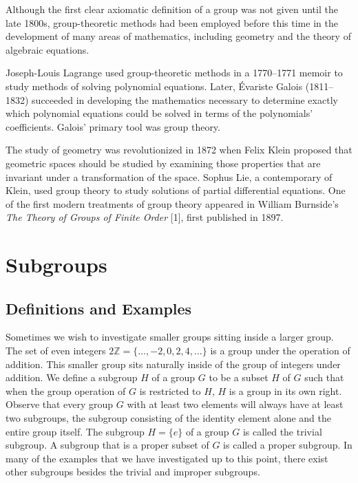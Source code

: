  
\histhead
 
 
\noindent
{\small \histf
Although the first clear axiomatic definition of a group was not given
until the late 1800s,  group-theoretic methods had been employed
before this time in the development of  many areas of mathematics,
including geometry and the theory of algebraic equations.  
 

Joseph-Louis Lagrange used
group-theoretic methods in a 1770--1771 memoir to study methods of
solving polynomial equations.  Later, \'{E}variste
Galois (1811--1832) succeeded in
developing the mathematics necessary to determine exactly which
polynomial equations could be  solved in terms of the polynomials'
coefficients. Galois' primary tool was group theory. 
}

{\small \histf
The study of geometry was revolutionized in 1872 when Felix
Klein proposed that geometric spaces should be
studied by examining those properties that are invariant under a
transformation of the space. Sophus Lie, a
contemporary of Klein, used group theory to study solutions of
partial differential equations.  One of the first modern treatments of
group theory appeared in William Burnside's
{\it The Theory of Groups of Finite Order\/} [1], first published in
1897.  
\histbox
}


 
 
 
\section{Subgroups}\label{groups_section_subgroups}
 
 
\subsection*{Definitions and Examples}
 
 
Sometimes we wish to investigate smaller groups sitting
inside a larger group.   The set of even integers $2{\mathbb Z} = \{
\ldots, -2, 0, 2, 4, \ldots \}$ is a group  under the operation of
addition. This smaller group sits naturally inside of the group of
integers under addition.  We define a {\bfi
subgroup} $H$ of a group $G$ to be a
subset $H$ of $G$ such that when the group operation of $G$ is
restricted to $H$, $H$ is a group in its own right. 
Observe that every group $G$ with at least two elements will always
have at least two subgroups, the subgroup consisting of the identity
element alone and the entire group itself. The subgroup $H = \{ e \}$
of a group $G$ is called the {\bfi trivial
subgroup}.  A subgroup that is a proper subset
of $G$ is called a {\bfi proper subgroup}. In
many of the examples that we have investigated up to this point, there
exist other subgroups besides the trivial and improper subgroups.  
 
